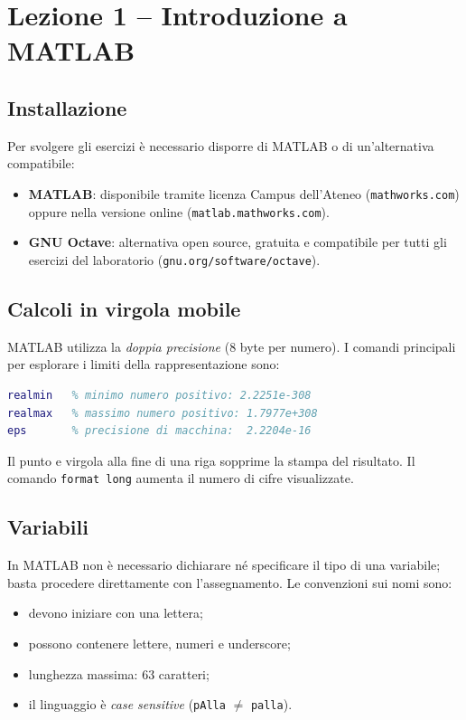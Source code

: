 \documentclass[12pt,a4paper,]{report}
\begin{document}
\section{Lezione 1 -- Introduzione a MATLAB}

\subsection{Installazione}

Per svolgere gli esercizi è necessario disporre di MATLAB o di un'alternativa
compatibile:
\begin{itemize}
  \item \textbf{MATLAB}: disponibile tramite licenza Campus dell'Ateneo
        (\texttt{mathworks.com}) oppure nella versione online
        (\texttt{matlab.mathworks.com}).
  \item \textbf{GNU Octave}: alternativa open source, gratuita e compatibile
        per tutti gli esercizi del laboratorio (\texttt{gnu.org/software/octave}).
\end{itemize}

\subsection{Calcoli in virgola mobile}

MATLAB utilizza la \textit{doppia precisione} (8 byte per numero).
I comandi principali per esplorare i limiti della rappresentazione sono:

\begin{lstlisting}[language=Matlab]
realmin   % minimo numero positivo: 2.2251e-308
realmax   % massimo numero positivo: 1.7977e+308
eps       % precisione di macchina:  2.2204e-16
\end{lstlisting}

Il punto e virgola alla fine di una riga sopprime la stampa del risultato.
Il comando \texttt{format long} aumenta il numero di cifre visualizzate.

\subsection{Variabili}

In MATLAB non è necessario dichiarare né specificare il tipo di una variabile;
basta procedere direttamente con l'assegnamento. Le convenzioni sui nomi sono:
\begin{itemize}
  \item devono iniziare con una lettera;
  \item possono contenere lettere, numeri e underscore;
  \item lunghezza massima: 63 caratteri;
  \item il linguaggio è \textit{case sensitive} (\texttt{pAlla} $\neq$ \texttt{palla}).
\end{itemize}
\end{document}

